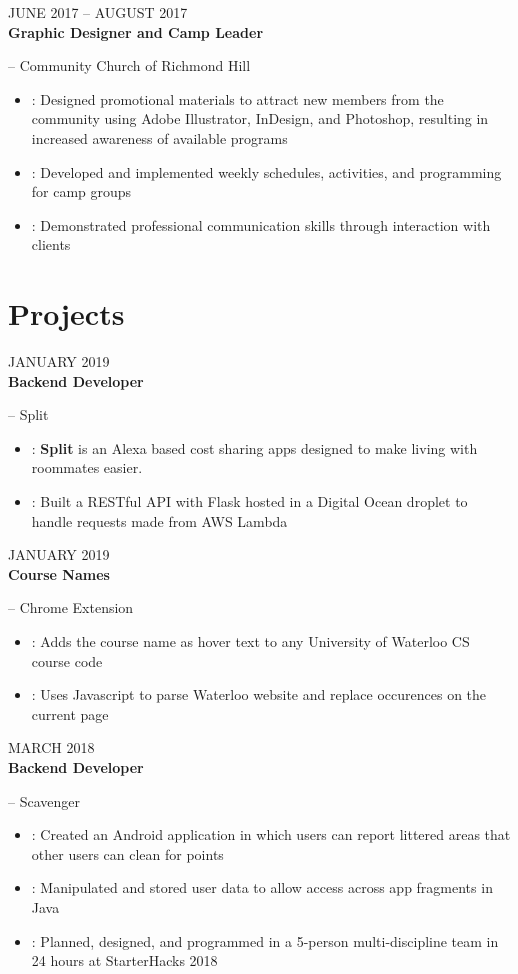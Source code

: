 \documentclass[letterpaper, 11pt]{article}
\newcommand{\styleDate}[1]{
    {{\color{resGray}\MakeTextUppercase{#1}}}
}
\newcommand{\styleDescription}[1]{
    {\color{resGray}#1}
}
\newcommand{\styleEmployer}[1]{
    {\Large{\color{resGray}#1}}
}
\newcommand{\stylePosition}[1]{
    {\Large{\textbf{\color{resBlue}#1}}}
}
\newcommand{\resBulletPoint}[2][]{
    \item\styleDescription{
        \ifthenelse
            {\isempty{#1}}
            {}
            {\textbf{#1}: }
        #2
    }
}
\newcommand{\resItem}[3]{
    \vspace{6pt}
    \styleDate{#3} \\
    \stylePosition{#1}\styleEmployer{-- #2}
}
\newenvironment{resElement}[1][]{
    #1
    \begin{itemize}[leftmargin=2ex, nosep, noitemsep]
}{
    \end{itemize}
}
\begin{document}

    \begin{resElement}[
        \resItem
        {Graphic Designer and Camp Leader}
        {Community Church of Richmond Hill}
        {June 2017 -- August 2017}
    ]
        \resBulletPoint{Designed promotional materials to attract new members from the community using Adobe Illustrator, InDesign, and Photoshop, resulting in increased awareness of available programs}
        \resBulletPoint{Developed and implemented weekly schedules, activities, and programming for camp groups}
        \resBulletPoint{Demonstrated professional communication skills through interaction with clients}
    \end{resElement}

\section{Projects}
    \begin{resElement}[
        \resItem
        {Backend Developer}
        {Split}
        {January 2019}
    ]
        \resBulletPoint{\textbf{Split} is an Alexa based cost sharing apps designed to make living with roommates easier. }
        \resBulletPoint{Built a RESTful API with Flask hosted in a Digital Ocean droplet to handle requests made from AWS Lambda}
    \end{resElement}

    \begin{resElement}[
        \resItem
        {Course Names}
        {Chrome Extension}
        {January 2019}
    ]
        \resBulletPoint{Adds the course name as hover text to any University of Waterloo CS course code}
        \resBulletPoint{Uses Javascript to parse Waterloo website and replace occurences on the current page}
    \end{resElement}

    \begin{resElement}[
        \resItem
        {Backend Developer}
        {Scavenger}
        {March 2018}
    ]
        \resBulletPoint{Created an Android application in which users can report littered areas that other users can clean for points}
        \resBulletPoint{Manipulated and stored user data to allow access across app fragments in Java}
        \resBulletPoint{Planned, designed, and programmed in a 5-person multi-discipline team in 24 hours at StarterHacks 2018}
    \end{resElement}
\end{document}
